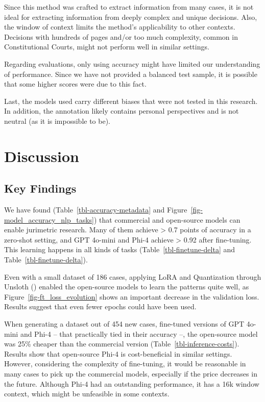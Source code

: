 \documentclass[
  12pt,
]{article}
\begin{document}
Since this method was crafted to extract information from many cases, it
is not ideal for extracting information from deeply complex and unique
decisions. Also, the window of context limits the method's applicability
to other contexts. Decisions with hundreds of pages and/or too much
complexity, common in Constitutional Courts, might not perform well in
similar settings.

Regarding evaluations, only using accuracy might have limited our
understanding of performance. Since we have not provided a balanced test
sample, it is possible that some higher scores were due to this fact.

Last, the models used carry different biases that were not tested in
this research. In addition, the annotation likely contains personal
perspectives and is not neutral (as it is impossible to be).

\section{Discussion}\label{sec-discussion}

\subsection{Key Findings}\label{sec-key-findinds}

We have found (Table~\ref{tbl-accuracy-metadata} and
Figure~\ref{fig-model_accuracy_nlp_tasks}) that commercial and
open-source models can enable jurimetric research. Many of them achieve
\textgreater{} 0.7 points of accuracy in a zero-shot setting, and GPT
4o-mini and Phi-4 achieve \textgreater{} 0.92 after fine-tuning. This
learning happens in all kinds of tasks (Table~\ref{tbl-finetune-delta}
and Table~\ref{tbl-finetune-delta}).

Even with a small dataset of 186 cases, applying LoRA and Quantization
through Unsloth () enabled the open-source models to learn the patterns quite
well, as Figure~\ref{fig-ft_loss_evolution} shows an important decrease
in the validation loss. Results suggest that even fewer epochs could
have been used.

When generating a dataset out of 454 new cases, fine-tuned versions of
GPT 4o-mini and Phi-4 -- that practically tied in their accuracy --, the
open-source model was 25\% cheaper than the commercial version
(Table~\ref{tbl-inference-costs}). Results show that open-source Phi-4
is cost-beneficial in similar settings. However, considering the
complexity of fine-tuning, it would be reasonable in many cases to pick
up the commercial models, especially if the price decreases in the
future. Although Phi-4 had an outstanding performance, it has a 16k
window context, which might be unfeasible in some contexts.
\end{document}
